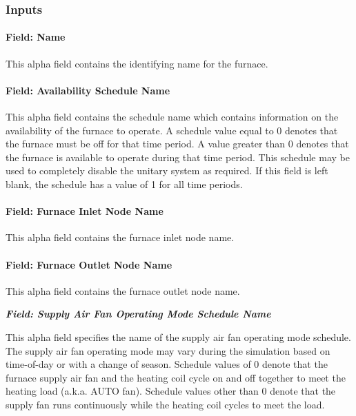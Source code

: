 \subsubsection{Inputs}\label{inputs-5-033}

\paragraph{Field: Name}\label{field-name-6-025}

This alpha field contains the identifying name for the furnace.

\paragraph{Field: Availability Schedule Name}\label{field-availability-schedule-name-5-004}

This alpha field contains the schedule name which contains information on the availability of the furnace to operate. A schedule value equal to 0 denotes that the furnace must be off for that time period. A value greater than 0 denotes that the furnace is available to operate during that time period. This schedule may be used to completely disable the unitary system as required. If this field is left blank, the schedule has a value of 1 for all time periods.

\paragraph{Field: Furnace Inlet Node Name}\label{field-furnace-inlet-node-name}

This alpha field contains the furnace inlet node name.

\paragraph{Field: Furnace Outlet Node Name}\label{field-furnace-outlet-node-name}

This alpha field contains the furnace outlet node name.

\textbf{\emph{Field: Supply Air Fan Operating Mode Schedule Name}}

This alpha field specifies the name of the supply air fan operating mode schedule. The supply air fan operating mode may vary during the simulation based on time-of-day or with a change of season. Schedule values of 0 denote that the furnace supply air fan and the heating coil cycle on and off together to meet the heating load (a.k.a. AUTO fan). Schedule values other than 0 denote that the supply fan runs continuously while the heating coil cycles to meet the load.

